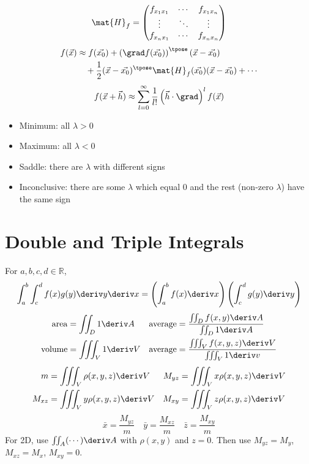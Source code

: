 \documentclass[10pt, a4paper]{article}
\begin{document}
\begin{landscape}
\begin{multicols}{3}
    \[\mat{H}_f = \begin{pmatrix}
        f_{x_{1} x_{1}} & \cdots & f_{x_{1} x_{n}} \\ 
        \vdots & \ddots & \vdots \\ 
        f_{x_{n} x_{1}} & \cdots & f_{x_{n} x_{n}} \\ 
    \end{pmatrix}\]
    \begin{align*}
        f(\vec{x}) &\approx f(\vec{x_0}) + \left(\grad f (\vec{x_0})\right)^{\tpose} (\vec{x} - \vec{x_0}) \\
        &\quad + \frac{1}{2} (\vec{x} - \vec{x_0})^{\tpose} \mat{H}_f(\vec{x_0}) (\vec{x} - \vec{x_0}) + \cdots
    \end{align*}
    \[
        f(\vec{x} + \vec{h}) \approx \sum_{l=0}^{\infty} \frac{1}{l!} \left(\vec{h} \cdot \grad\right)^{l} f(\vec{x})
    \]
    \begin{itemize}
        \item Minimum: all \(\lambda > 0\)
        \item Maximum: all \(\lambda < 0\)
        \item Saddle: there are \(\lambda\) with different signs
        \item Inconclusive: there are some \(\lambda\) which equal 0 and the rest (non-zero \(\lambda\)) have the same sign
    \end{itemize}

    \section{Double and Triple Integrals}

    For \(a, b, c, d \in \mathbb{R}\),
    \[
        \int_{a}^{b} \int_{c}^{d} f(x) g(y) \deriv y \deriv x
        = \left(\int_{a}^{b} f(x) \deriv x\right) \left(\int_{c}^{d} g(y) \deriv y\right)
    \]
    \begin{align*}
        \mathrm{area} &= \iint_{D} 1 \deriv A  &
        \mathrm{average} &= \frac{\iint_{D} f(x, y) \deriv A}{\iint_{D} 1 \deriv A} \\
        \mathrm{volume} &= \iiint_{V} 1 \deriv V  &
        \mathrm{average} &= \frac{\iiint_{V} f(x, y, z) \deriv V}{\iiint_{V} 1 \deriv v}
    \end{align*}
    \begin{align*}
        m &= \iiint_V \rho(x, y, z) \deriv V  &  M_{yz} &= \iiint_V x \rho(x, y, z) \deriv V \\
        M_{xz} &= \iiint_V y \rho(x, y, z) \deriv V  &  M_{xy} &= \iiint_V z \rho(x, y, z) \deriv V
    \end{align*}
    \[\bar x = \frac{M_{yz}}{m} \quad \bar y = \frac{M_{xz}}{m} \quad \bar z = \frac{M_{xy}}{m}\]
    For 2D, use \(\iint_{A} (\cdots) \deriv A\) with \(\rho(x, y)\) and \(z = 0\). Then use
    \(M_{yz} = M_y\), \(M_{xz} = M_x\), \(M_{xy} = 0\).


\end{multicols}
\end{landscape}
\end{document}

